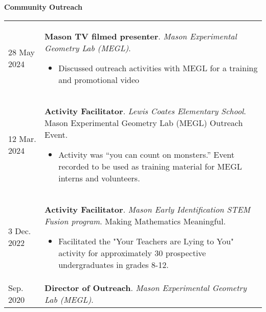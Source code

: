     \vspace{-1em}
    

    \textbf{\large Community Outreach}
    
    \begin{center}
    {
    \renewcommand{\arraystretch}{1.2}
    \begin{longtable}{p{}  p{}}
    28 May  2024 & \textbf{Mason TV filmed presenter}. \textit{Mason Experimental Geometry Lab (MEGL)}. 
        \hspace{-1em}

        {\small
        \begin{itemize}
        \setlength{\parindent}{0em}
        \item[] Discussed outreach activities with MEGL for a training and promotional video
        \end{itemize}
        }
        \vspace{-1em}
         \\ 
12 Mar.  2024 & \textbf{Activity Facilitator}. \textit{Lewis Coates Elementary School}.  Mason Experimental Geometry Lab (MEGL) Outreach Event. 
        \hspace{-1em}

        {\small
        \begin{itemize}
        \setlength{\parindent}{0em}
        \item[] Activity was ``you can count on monsters.'' Event recorded to be used as training material for MEGL interns and volunteers.
        \end{itemize}
        }
        \vspace{-1em}
         \\ 
3 Dec.  2022 & \textbf{Activity Facilitator}. \textit{Mason Early Identification STEM Fusion program}.  Making Mathematics Meaningful. 
        \hspace{-1em}

        {\small
        \begin{itemize}
        \setlength{\parindent}{0em}
        \item[] Facilitated the "Your Teachers are Lying to You" activity for approximately 30 prospective undergraduates in grades 8-12.
        \end{itemize}
        }
        \vspace{-1em}
         \\ 
 Sep.  2020 & \textbf{Director of Outreach}. \textit{Mason Experimental Geometry Lab (MEGL)}. 
        \hspace{-1em}


\end{longtable}}
\end{center}
